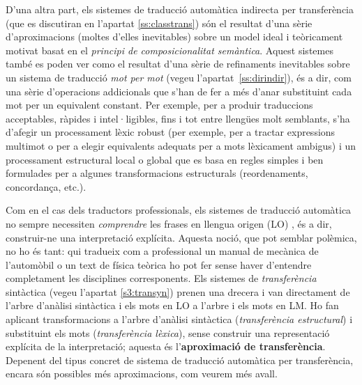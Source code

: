 D'una altra part, els sistemes de traducció automàtica indirecta per
transferència (que es discutiran en l'apartat \ref{ss:classtrans}) són
el resultat d'una sèrie d'aproximacions (moltes d'elles inevitables)
sobre un model ideal i teòricament motivat basat en el \emph{principi
  de composicionalitat semàntica}. Aquest sistemes també es poden ver
como el resultat d'una sèrie de refinaments inevitables sobre un
sistema de traducció \emph{mot per mot} (vegeu
l'apartat~\ref{ss:dirindir}), és a dir, com una sèrie d'operacions
addicionals que s'han de fer a més d'anar substituint cada mot per un
equivalent constant. Per exemple, per a produir traduccions
acceptables, ràpides i intel·ligibles, fins i tot entre llengües molt
semblants, s'ha d'afegir un processament lèxic robust (per exemple,
per a tractar expressions multimot o per a elegir equivalents adequats
per a mots lèxicament ambigus) i un processament estructural local o
global que es basa en regles simples i ben formulades per a algunes
transformacions estructurals (reordenaments, concordança,
etc.). 


Com en el cas dels traductors professionals, els sistemes de traducció
automàtica no sempre necessiten \emph{comprendre} les frases en
llengua origen (LO) , és a dir, construir-ne una interpretació
explícita. Aquesta noció, que pot semblar polèmica, no ho és tant: qui
tradueix com a professional un manual de mecànica de l'automòbil o un
text de física teòrica ho pot fer sense haver d'entendre completament
les disciplines corresponents. Els sistemes de \emph{transferència}
sintàctica (vegeu l'apartat \ref{s3:transyn}) prenen una drecera i van
directament de l'arbre d'anàlisi sintàctica i els mots en LO a l'arbre
i els mots en LM. Ho fan aplicant transformacions a l'arbre d'anàlisi
sintàctica (\emph{transferència estructural}) i substituint els mots
(\emph{transferència lèxica}), sense construir una representació
explícita de la interpretació; aquesta és l'\textbf{aproximació de
  transferència}. Depenent del tipus concret de sistema de traducció
automàtica per transferència, encara són possibles més aproximacions,
com veurem més avall.

